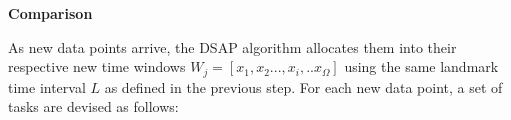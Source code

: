     
    

    
    
\vspace{7mm}
\hspace{-1 cm}  
\textbf{Comparison}

As new data points arrive, the DSAP algorithm allocates them into their respective new time windows $W_j = [x_1,x_2...,x_i,..x_{\Omega}]$ using the same landmark time interval $L$ as defined in the previous step. For each new data point, a set of tasks are devised as follows:

